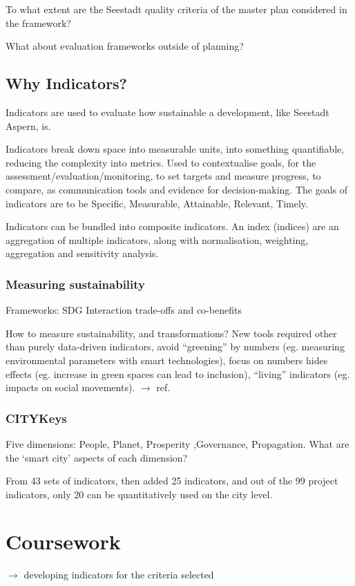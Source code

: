 \documentclass{article}
\begin{document}
To what extent are the Seestadt quality criteria of the master plan considered in the framework?

What about evaluation frameworks outside of planning?

\subsection{Why Indicators?}

Indicators are used to evaluate how sustainable a development, like Seestadt Aspern, is.

Indicators break down space into measurable units, into something quantifiable, reducing the complexity into metrics. Used to contextualise goals, for the assessment/evaluation/monitoring, to set targets and measure progress, to compare, as communication tools and evidence for decision-making. The goals of indicators are to be Specific, Measurable, Attainable, Relevant, Timely.

Indicators can be bundled into composite indicators. An index (indices) are an aggregation of multiple indicators, along with normalisation, weighting, aggregation and sensitivity analysis.

\subsubsection{Measuring sustainability}

Frameworks: SDG Interaction trade-offs and co-benefits

How to measure sustainability, and transformations? New tools required other than purely data-driven indicators, avoid ``greening'' by numbers (eg. measuring environmental parameters with smart technologies), focus on numbers hides effects (eg. increase in green spaces can lead to inclusion), ``living'' indicators (eg. impacts on social movements). $\rightarrow$ ref. \parencite{kaika2017don}

\subsubsection{CITYKeys}

Five dimensions: People, Planet, Prosperity ,Governance, Propagation. What are the `smart city' aspects of each dimension?

From 43 sets of indicators, then added 25 indicators, and out of the 99 project indicators, only 20 can be quantitatively used on the city level. 

\section{Coursework}

$\rightarrow$ developing indicators for the criteria selected
\end{document}
